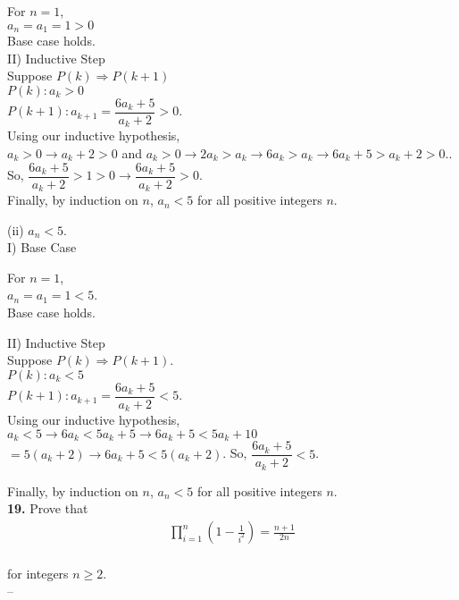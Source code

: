 \documentclass[paper=letter, fontsize=11pt]{scrartcl} %
\begin{document}
For $n = 1$, \\
$a_n = a_1 = 1 > 0$ \\
Base case holds. \\

II) Inductive Step\\

Suppose $P(k) \Rightarrow P(k+1)$ \\
$P(k): a_k > 0$ \\
$P(k+1): a_{k+1} = \dfrac{6a_k + 5}{a_k + 2} > 0$.\\

Using our inductive hypothesis, \\
$a_k > 0 \rightarrow a_k + 2 > 0$ and $a_k > 0 \rightarrow 
2a_k > a_k \rightarrow 6a_k > a_k \rightarrow 6a_k + 5 > a_k + 2 > 0.$. \\
So, $\dfrac{6a_k + 5}{a_k + 2} > 1 > 0 \rightarrow \dfrac{6a_k + 5}{a_k + 2} > 0$. \\

Finally, by induction on $n$, $a_n < 5$ for all positive integers $n$.

(ii) $a_n < 5$. \\
I) Base Case

For $n = 1$, \\
$a_n = a_1 = 1 < 5$. \\
Base case holds.

II) Inductive Step \\

Suppose $P(k) \Rightarrow P(k+1)$.\\
$P(k): a_k < 5$ \\
$P(k+1): a_{k+1} = \dfrac{6a_k + 5}{a_k + 2} < 5$. \\

Using our inductive hypothesis, \\
$a_k < 5 \rightarrow 6a_k < 5a_k + 5 \rightarrow 6a_k + 5 < 5a_k + 10$ \\ 
$= 5(a_k + 2) \rightarrow 6a_k + 5 < 5(a_k + 2)$.
So, $\dfrac{6a_k + 5}{a_k + 2} < 5$.

Finally, by induction on $n$, $a_n < 5$ for all positive integers $n$.
\\

\textbf{19.} Prove that 
\begin{align*}
	\prod_{i=1}^n (1 - \frac{1}{i^2}) = \frac{n + 1}{2n}
\end{align*} \\
for integers $n \ge 2$.\\
-- \\
\end{document}
